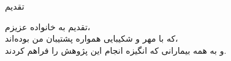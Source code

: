 \thispagestyle{empty}
\vspace*{3em}
\begin{center}
  {\XTitr\large تقدیم}
\end{center}
\vspace{2em}

\begin{center}
  \begingroup
  تقدیم به خانواده عزیزم،\\[0.8em]
  که با مهر و شکیبایی همواره پشتیبان من بوده‌اند،\\[0.8em]
  و به همه بیمارانی که انگیزه انجام این پژوهش را فراهم کردند.
  \endgroup
\end{center}
\clearpage
